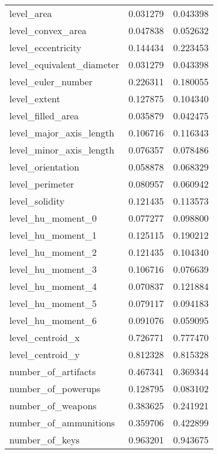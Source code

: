 \begin{longtable}{lrr}
	\bottomrule
	\endlastfoot
	level\_area                    &  0.031279 &  0.043398 \\
	level\_convex\_area             &  0.047838 &  0.052632 \\
	level\_eccentricity            &  0.144434 &  0.223453 \\
	level\_equivalent\_diameter     &  0.031279 &  0.043398 \\
	level\_euler\_number            &  0.226311 &  0.180055 \\
	level\_extent                  &  0.127875 &  0.104340 \\
	level\_filled\_area             &  0.035879 &  0.042475 \\
	level\_major\_axis\_length       &  0.106716 &  0.116343 \\
	level\_minor\_axis\_length       &  0.076357 &  0.078486 \\
	level\_orientation             &  0.058878 &  0.068329 \\
	level\_perimeter               &  0.080957 &  0.060942 \\
	level\_solidity                &  0.121435 &  0.113573 \\
	level\_hu\_moment\_0             &  0.077277 &  0.098800 \\
	level\_hu\_moment\_1             &  0.125115 &  0.190212 \\
	level\_hu\_moment\_2             &  0.121435 &  0.104340 \\
	level\_hu\_moment\_3             &  0.106716 &  0.076639 \\
	level\_hu\_moment\_4             &  0.070837 &  0.121884 \\
	level\_hu\_moment\_5             &  0.079117 &  0.094183 \\
	level\_hu\_moment\_6             &  0.091076 &  0.059095 \\
	level\_centroid\_x              &  0.726771 &  0.777470 \\
	level\_centroid\_y              &  0.812328 &  0.815328 \\
	number\_of\_artifacts           &  0.467341 &  0.369344 \\
	number\_of\_powerups            &  0.128795 &  0.083102 \\
	number\_of\_weapons             &  0.383625 &  0.241921 \\
	number\_of\_ammunitions         &  0.359706 &  0.422899 \\
	number\_of\_keys                &  0.963201 &  0.943675 \\

\end{longtable}
